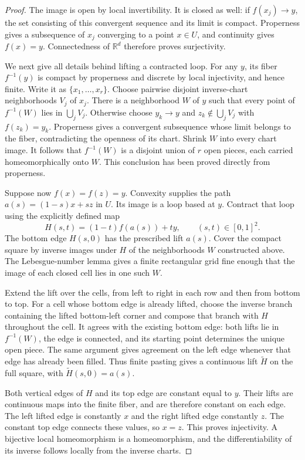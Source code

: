 \documentclass[11pt]{article}
\newcommand{\R}{\mathbb R}
\theoremstyle{remark}
\numberwithin{equation}{section}
\begin{document}
\begin{proof}
The image is open by local invertibility.  It is closed as well:
if $f(x_j)\to y$, the set consisting of this convergent sequence
and its limit is compact.  Properness gives a subsequence of $x_j$
converging to a point $x\in U$, and continuity gives $f(x)=y$.
Connectedness of $\R^d$ therefore proves surjectivity.

We next give all details behind lifting a contracted loop.
For any $y$, its fiber $f^{-1}(y)$ is compact by properness and
discrete by local injectivity, and hence finite.  Write it as
$\{x_1,\ldots,x_r\}$.  Choose pairwise disjoint inverse-chart
neighborhoods $V_j$ of $x_j$.  There is a neighborhood $W$ of $y$
such that every point of $f^{-1}(W)$ lies in $\bigcup_jV_j$.
Otherwise choose $y_k\to y$ and $z_k\notin\bigcup_jV_j$ with
$f(z_k)=y_k$.  Properness gives a convergent subsequence whose limit
belongs to the fiber, contradicting the openness of its chart.
Shrink $W$ into every chart image.  It follows that $f^{-1}(W)$
is a disjoint union of $r$ open pieces, each carried homeomorphically
onto $W$.  This conclusion has been proved directly from properness.

Suppose now $f(x)=f(z)=y$.  Convexity supplies the path
$a(s)=(1-s)x+sz$ in $U$.  Its image is a loop based at $y$.
Contract that loop using the explicitly defined map
\[
 H(s,t)=(1-t)f(a(s))+ty,\qquad (s,t)\in[0,1]^2.
\]
The bottom edge $H(s,0)$ has the prescribed lift $a(s)$.
Cover the compact square by inverse images under $H$ of the
neighborhoods $W$ constructed above.  The Lebesgue-number lemma
gives a finite rectangular grid fine enough that the image of
each closed cell lies in one such $W$.

Extend the lift over the cells, from left to right in each row and
then from bottom to top.  For a cell whose bottom edge is already
lifted, choose the inverse branch containing the lifted bottom-left
corner and compose that branch with $H$ throughout the cell.
It agrees with the existing bottom edge: both lifts lie in
$f^{-1}(W)$, the edge is connected, and its starting point determines
the unique open piece.  The same argument gives agreement on the
left edge whenever that edge has already been filled.  Thus finite
pasting gives a continuous lift $\widetilde H$ on the full square,
with $\widetilde H(s,0)=a(s)$.

Both vertical edges of $H$ and its top edge are constant equal to
$y$.  Their lifts are continuous maps into the finite fiber, and
are therefore constant on each edge.  The left lifted edge is
constantly $x$ and the right lifted edge constantly $z$.  The
constant top edge connects these values, so $x=z$.  This proves
injectivity.  A bijective local homeomorphism is a homeomorphism,
and the differentiability of its inverse follows locally from
the inverse charts.
\end{proof}
\end{document}
